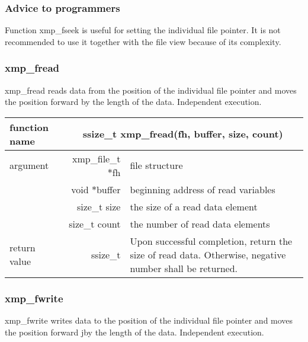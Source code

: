    \subsubsection*{Advice to programmers}

   Function xmp\_fseek is useful for setting the individual file pointer.
   It is not recommended to use it together with the file view because
   of its complexity.

   \subsubsection{xmp\_fread}
   xmp\_fread reads data from the position of the individual file
   pointer and moves the position forward by the length of the data.
   Independent execution.

   \begin{table}[h]
    \begin{center}
     \begin{tabular}{|l|r|p{80mm}|}
      \hline
      {\bf function name}  & \multicolumn{2}{c|}{\bf ssize\_t
      xmp\_fread(fh, buffer, size, count)} \\ \hline \hline
      argument & xmp\_file\_t $*$fh & file structure \\ \cline{2-3}
      & void $*$buffer & beginning address of read variables \\ \cline{2-3}
      & size\_t size & the size of a read data element \\ \cline{2-3}
      & size\_t count & the number of read data elements \\ \hline
      return value & ssize\_t & Upon successful completion, return the size
	      of read data. Otherwise, negative number shall be
	      returned. \\ \hline
      \end{tabular}
     \end{center}
   \end{table}

   \subsubsection{xmp\_fwrite}
   xmp\_fwrite writes data to the position of the individual file
   pointer and moves the position forward jby the length of the data.
   Independent execution.

